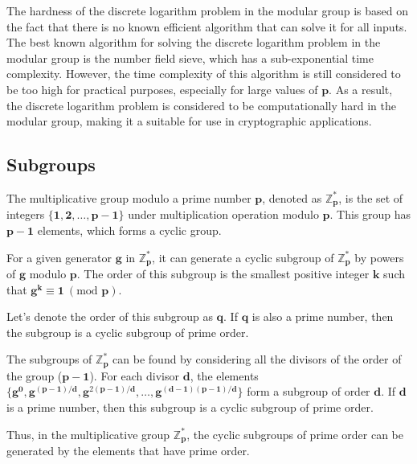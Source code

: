 The hardness of the discrete logarithm problem in the modular group is based on the fact that there is no known efficient algorithm that can solve it for all inputs. The best known algorithm for solving the discrete logarithm problem in the modular group is the number field sieve, which has a sub-exponential time complexity. However, the time complexity of this algorithm is still considered to be too high for practical purposes, especially for large values of $\boldsymbol{p}$. As a result, the discrete logarithm problem is considered to be computationally hard in the modular group, making it a suitable for use in cryptographic applications.

\subsection{Subgroups}

The multiplicative group modulo a prime number $\boldsymbol{p}$, denoted as $\mathbb{Z}_{\boldsymbol{p}}^{*}$, is the set of integers $\{\boldsymbol{1}, \boldsymbol{2}, \ldots, \boldsymbol{p-1}\}$ under multiplication operation modulo $\boldsymbol{p}$. This group has $\boldsymbol{p-1}$ elements, which forms a cyclic group.

For a given generator $\boldsymbol{g}$ in $\mathbb{Z}_{\boldsymbol{p}}^{*}$, it can generate a cyclic subgroup of $\mathbb{Z}_{\boldsymbol{p}}^{*}$ by powers of $\boldsymbol{g}$ modulo $\boldsymbol{p}$. The order of this subgroup is the smallest positive integer $\boldsymbol{k}$ such that $\boldsymbol{g}^{\boldsymbol{k}} \equiv \boldsymbol{1} \ (\text{mod } \boldsymbol{p})$.

Let's denote the order of this subgroup as $\boldsymbol{q}$. If $\boldsymbol{q}$ is also a prime number, then the subgroup is a cyclic subgroup of prime order.

The subgroups of $\mathbb{Z}_{\boldsymbol{p}}^{*}$ can be found by considering all the divisors of the order of the group ($\boldsymbol{p-1}$). For each divisor $\boldsymbol{d}$, the elements $\{\boldsymbol{g}^{\boldsymbol{0}}, \boldsymbol{g}^{(\boldsymbol{p-1})/\boldsymbol{d}}, \boldsymbol{g}^{2(\boldsymbol{p-1})/\boldsymbol{d}}, \ldots, \boldsymbol{g}^{(\boldsymbol{d-1})(\boldsymbol{p-1})/\boldsymbol{d}}\}$ form a subgroup of order $\boldsymbol{d}$. If $\boldsymbol{d}$ is a prime number, then this subgroup is a cyclic subgroup of prime order.

Thus, in the multiplicative group $\mathbb{Z}_{\boldsymbol{p}}^{*}$, the cyclic subgroups of prime order can be generated by the elements that have prime order.

